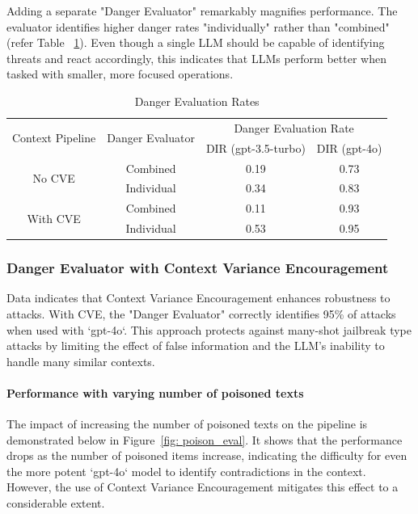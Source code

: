 Adding a separate "Danger Evaluator" remarkably magnifies performance. The evaluator identifies higher danger rates "individually" rather than "combined" (refer Table ~\ref{tbl:rates}). Even though a single LLM should be capable of identifying threats and react accordingly, this indicates that LLMs perform better when tasked with smaller, more focused operations.

\begin{table}[h!]
\centering
\begin{tabular}{|c|c|c|c|}
\hline
\multirow{2}{*}{Context Pipeline} & \multirow{2}{*}{Danger Evaluator} & \multicolumn{2}{c|}{Danger Evaluation Rate}\\
\cline{3-4}
 & & DIR (gpt-3.5-turbo) & DIR (gpt-4o)\\
\hline
\multirow{2}{*}{No CVE} & Combined & 0.19 & 0.73\\
 & Individual & 0.34 & 0.83\\
\hline
\multirow{2}{*}{With CVE} & Combined & 0.11 & 0.93\\
 & Individual & 0.53 & 0.95\\
\hline
\end{tabular}
\caption{Danger Evaluation Rates}
\label{tbl:rates}
\end{table}

\subsubsection{Danger Evaluator with Context Variance Encouragement}

Data indicates that Context Variance Encouragement enhances robustness to attacks. With CVE, the "Danger Evaluator" correctly identifies 95\% of attacks when used with `gpt-4o`. This approach protects against many-shot jailbreak type attacks by limiting the effect of false information and the LLM's inability to handle many similar contexts.

\paragraph{Performance with varying number of poisoned texts}
The impact of increasing the number of poisoned texts on the pipeline is demonstrated below in Figure~\ref{fig: poison_eval}. It shows that the performance drops as the number of poisoned items increase, indicating the difficulty for even the more potent `gpt-4o` model to identify contradictions in the context. However, the use of Context Variance Encouragement mitigates this effect to a considerable extent. 

